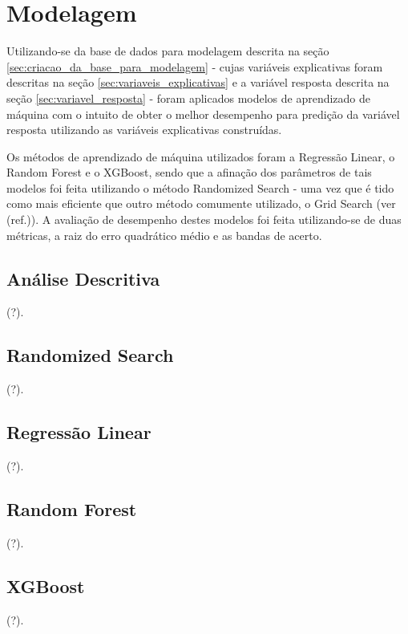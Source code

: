 \chapter{Modelagem}
\label{cap:modelagem}

Utilizando-se da base de dados para modelagem descrita na seção \ref{sec:criacao_da_base_para_modelagem} - cujas variáveis explicativas foram descritas na seção \ref{sec:variaveis_explicativas} e a variável resposta descrita na seção \ref{sec:variavel_resposta} - foram aplicados modelos de aprendizado de máquina com o intuito de obter o melhor desempenho para predição da variável resposta utilizando as variáveis explicativas construídas.

Os métodos de aprendizado de máquina utilizados foram a Regressão Linear, o Random Forest e o XGBoost, sendo que a afinação dos parâmetros de tais modelos foi feita utilizando o método Randomized Search - uma vez que é tido como mais eficiente que outro método comumente utilizado, o Grid Search (ver (ref.)). A avaliação de desempenho destes modelos foi feita utilizando-se de duas métricas, a raiz do erro quadrático médio e as bandas de acerto.

\section{Análise Descritiva}
\label{sec:analise_descritiva}



(?).

\section{Randomized Search}
\label{sec:randomized_search}

(?).

\section{Regressão Linear}
\label{sec:regressao_linear}

(?).

\section{Random Forest}
\label{sec:random_forest}

(?).

\section{XGBoost}
\label{sec:xgboost}

(?).

